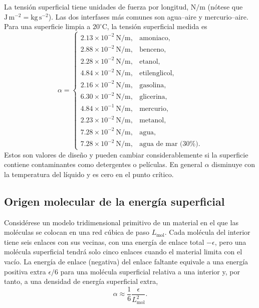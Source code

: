 La tensión superficial tiene unidades de fuerza por longitud, $\mathrm{N/m}$ (nótese que $\mathrm{J\,m^{-2}} = \mathrm{kg\,s^{-2}}$). Las dos interfases más comunes son agua--aire y mercurio--aire. Para una superficie limpia a $20^\circ\mathrm{C}$, la tensión superficial medida es
$$
\alpha = \begin{cases}
2.13\times10^{-2}\ \mathrm{N/m}, & \text{amoniaco},\\
2.88\times10^{-2}\ \mathrm{N/m}, & \text{benceno},\\
2.28\times10^{-2}\ \mathrm{N/m}, & \text{etanol},\\
4.84\times10^{-2}\ \mathrm{N/m}, & \text{etilenglicol},\\
2.16\times10^{-2}\ \mathrm{N/m}, & \text{gasolina},\\
6.30\times10^{-2}\ \mathrm{N/m}, & \text{glicerina},\\
4.84\times10^{-1}\ \mathrm{N/m}, & \text{mercurio},\\
2.23\times10^{-2}\ \mathrm{N/m}, & \text{metanol},\\
7.28\times10^{-2}\ \mathrm{N/m}, & \text{agua},\\
7.28\times10^{-2}\ \mathrm{N/m}, & \text{agua de mar (30\%)}.
\end{cases}
$$
Estos son valores de diseño y pueden cambiar considerablemente si la superficie contiene contaminantes como detergentes o películas. En general $\alpha$ disminuye con la temperatura del líquido y es cero en el punto crítico.

\figuraTensionAguaTemperatura

\subsection{Origen molecular de la energía superficial}

Considérese un modelo tridimensional primitivo de un material en el que las moléculas se colocan en una red cúbica de paso $L_{\mathrm{mol}}$. Cada molécula del interior tiene seis enlaces con sus vecinas, con una energía de enlace total $-\epsilon$, pero una molécula superficial tendrá solo cinco enlaces cuando el material limita con el vacío. La energía de enlace (negativa) del enlace faltante equivale a una energía positiva extra $\epsilon/6$ para una molécula superficial relativa a una interior y, por tanto, a una densidad de energía superficial extra,
$$ \alpha \approx \frac{1}{6}\frac{\epsilon}{L_{\mathrm{mol}}^2}. $$

\figuraEnlacesSuperficie

